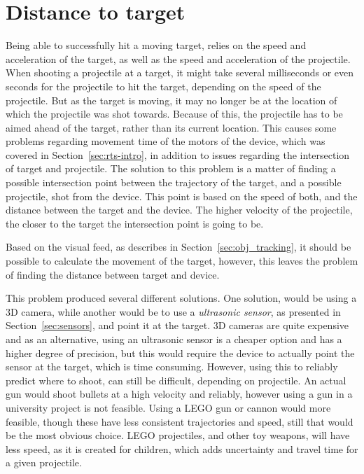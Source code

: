 \section{Distance to target}
Being able to successfully hit a moving target, relies on the speed and acceleration of the target, as well as the speed and acceleration of the projectile.
When shooting a projectile at a target, it might take several milliseconds or even seconds for the projectile to hit the target, depending on the speed of the projectile.
But as the target is moving, it may no longer be at the location of which the projectile was shot towards.
Because of this, the projectile has to be aimed ahead of the target, rather than its current location.
This causes some problems regarding movement time of the motors of the device, which was covered in Section~\ref{sec:rts-intro}, in addition to issues regarding the intersection of target and projectile.
The solution to this problem is a matter of finding a possible intersection point between the trajectory of the target, and a possible projectile, shot from the device. 
This point is based on the speed of both, and the distance between the target and the device. 
The higher velocity of the projectile, the closer to the target the intersection point is going to be.

Based on the visual feed, as describes in Section~\ref{sec:obj_tracking}, it should be possible to calculate the movement of the target, however, this leaves the problem of finding the distance between target and device.

This problem produced several different solutions.
One solution, would be using a 3D camera, while another would be to use a \textit{ultrasonic sensor}, as presented in Section~\ref{sec:sensors}, and point it at the target.
3D cameras are quite expensive and as an alternative, using an ultrasonic sensor is a cheaper option and has a higher degree of precision, but this would require the device to actually point the sensor at the target, which is time consuming\cite{sensorsaccuracy}.
However, using this to reliably predict where to shoot, can still be difficult, depending on projectile.
An actual gun would shoot bullets at a high velocity and reliably, however using a gun in a university project is not feasible.
Using a LEGO gun or cannon would more feasible, though these have less consistent trajectories and speed, still that would be the most obvious choice.
LEGO projectiles, and other toy weapons, will have less speed, as it is created for children, which adds uncertainty and travel time for a given projectile.

